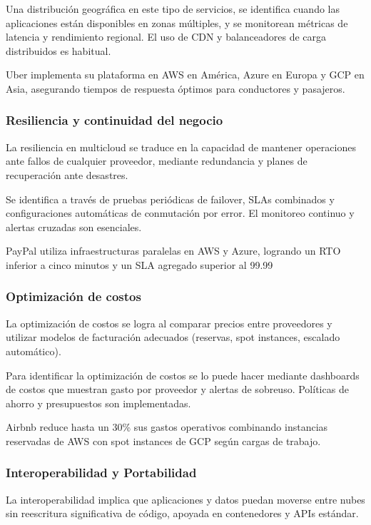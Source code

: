 {                Una distribución geográfica en este tipo de servicios, se identifica cuando las aplicaciones están disponibles en zonas múltiples, y se monitorean métricas de latencia y rendimiento regional. El uso de CDN y balanceadores de carga distribuidos es habitual.

                Uber implementa su plataforma en AWS en América, Azure en Europa y GCP en Asia, asegurando tiempos de respuesta óptimos para conductores y pasajeros.
            
            \subsubsection{Resiliencia y continuidad del negocio}
                La resiliencia en multicloud se traduce en la capacidad de mantener operaciones ante fallos de cualquier proveedor, mediante redundancia y planes de recuperación ante desastres.
                
                Se identifica a través de pruebas periódicas de failover, SLAs combinados y configuraciones automáticas de conmutación por error. El monitoreo continuo y alertas cruzadas son esenciales.
            
                PayPal utiliza infraestructuras paralelas en AWS y Azure, logrando un RTO inferior a cinco minutos y un SLA agregado superior al 99.99%
            
            \subsubsection{Optimización de costos}
                La optimización de costos se logra al comparar precios entre proveedores y utilizar modelos de facturación adecuados (reservas, spot instances, escalado automático).
                
                Para identificar la optimización de costos se lo puede hacer mediante dashboards de costos que muestran gasto por proveedor y alertas de sobreuso. Políticas de ahorro y presupuestos son implementadas.
            
                Airbnb reduce hasta un 30\% sus gastos operativos combinando instancias reservadas de AWS con spot instances de GCP según cargas de trabajo.
            
            \subsubsection{Interoperabilidad y Portabilidad}
                La interoperabilidad implica que aplicaciones y datos puedan moverse entre nubes sin reescritura significativa de código, apoyada en contenedores y APIs estándar.
            
}
